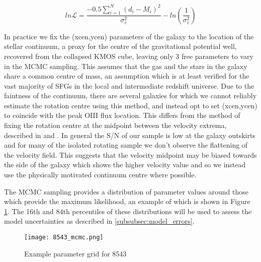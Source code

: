 \documentclass[a4paper,fleqn,usenatbib]{mn2e}
\newcommand{\Lagr}{\mathcal{L}}
\begin{document}
\begin{equation}\label{eq:likelihood}
   ln\Lagr = \frac{-0.5\sum_{i=1}^{N}(d_{i} - M_{i})^{2}}{\sigma_{v}^{2}} - ln\left(\frac{1}{\sigma_{v}^{2}}\right)
\end{equation}

In practice we fix the (xcen,ycen) parameters of the galaxy to the location of the stellar continuum, a proxy for the centre of the gravitational potential well, recovered from the collapsed KMOS cube, leaving only 3 free parameters to vary in the MCMC sampling.
This assumes that the gas and the stars in the galaxy share a common centre of mass, an assumption which is at least verified for the vast majority of SFGs in the local and intermediate redshift universe.
Due to the faintness of the continuum, there are several galaxies for which we cannot reliably estimate the rotation centre using this method, and instead opt to set (xcen,ycen) to coincide with the peak OIII flux location.
This differs from the method of fixing the rotation centre at the midpoint between the velocity extrema, described in \cite{Wisnioski2015} and \cite{Rodrigues2016}.
In general the S/N of our sample is low at the galaxy outskirts and for many of the isolated rotating sample we don't observe the flattening of the velocity field.
This suggests that the velocity midpoint may be biased towards the side of the galaxy which shows the higher velocity value and so we instead use the physically motivated continuum centre where possible.

The MCMC sampling provides a distribution of parameter values around those which provide the maximum likelihood, an example of which is shown in Figure \ref{fig:8543_mcmc}.
The 16th and 84th percentiles of these distributions will be used to assess the model uncertainties as described in \cref{subsubsec:model_errors}.


\begin{figure}
\centering
\texttt{[image: 8543\_mcmc.png]}
\caption{Example parameter grid for 8543}
\label{fig:8543_mcmc}
\end{figure}
\end{document}
